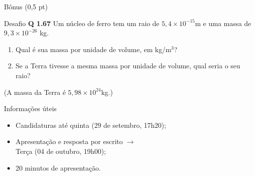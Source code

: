 \documentclass[xcolor=dvipsnames,table]{beamer}
\begin{document}
	\begin{frame}{Bônus (0,5 pt)}
		\begin{block}{Desafio}
			{\bf Q 1.67} Um núcleo de ferro tem um raio de $5,4 \times 10^{-15}$m e uma massa de $9,3 \times 10^{-26}$ kg.
			\begin{enumerate}
				\item Qual é sua massa por unidade de volume, em kg/m$^3$?
				\item Se a Terra tivesse a mesma massa por unidade de volume, qual seria o seu raio?
			\end{enumerate}
			(A massa da Terra é $5,98 \times 10^{24}$kg.) 
		\end{block} \pause
		\begin{block}{Informações úteis}
			\begin{itemize}
                \item Candidaturas até quinta (29 de setembro, 17h20);
                \item Apresentação e resposta por escrito $\rightarrow$ \\Terça (04 de outubro, 19h00);
                \item 20 minutos de apresentação.
			\end{itemize}
		\end{block} 
	\end{frame}
	
	\begin{frame}
		\titlepage
	\end{frame}
	
\end{document}
